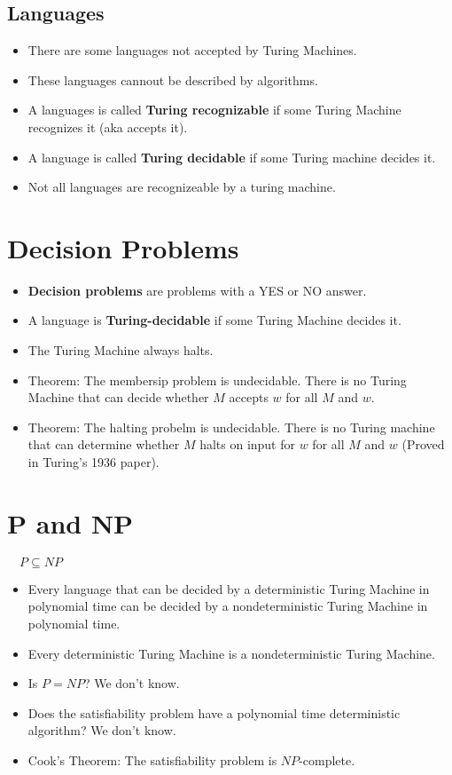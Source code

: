 \documentclass[letter]{article}
\begin{document}
\begin{multicols}{2}
  \subsection{Languages} 
  \begin{itemize} 
    \item There are some languages not accepted by Turing Machines.
    \item These languages cannout be described by algorithms.
    \item A languages is called \textbf{Turing recognizable} if some Turing
          Machine recognizes it (aka accepts it).
    \item A language is called \textbf{Turing decidable} if some Turing machine
          decides it.
    \item Not all languages are recognizeable by a turing machine.
  \end{itemize}

  \section{Decision Problems} 
  \begin{itemize} 
    \item \textbf{Decision problems} are problems with a YES or NO answer.
    \item A language is \textbf{Turing-decidable} if some Turing Machine decides
          it.
    \item The Turing Machine always halts.
    \item Theorem: The membersip problem is undecidable. There is no Turing
          Machine that can decide whether $M$ accepts $w$ for all $M$ and $w$.
    \item Theorem: The halting probelm is undecidable. There is no Turing
          machine that can determine whether $M$ halts on input for $w$ for all
          $M$ and $w$ (Proved in Turing's 1936 paper).
  \end{itemize}

  \section{P and NP} 
  $\quad P \subseteq NP$
  \begin{itemize} 
    \item Every language that can be decided by a deterministic Turing
          Machine in polynomial time can be decided by a nondeterministic
          Turing Machine in polynomial time.
    \item Every deterministic Turing Machine is a nondeterministic Turing
          Machine.
    \item Is $P = NP$? We don't know.
    \item Does the satisfiability problem have a polynomial time deterministic
          algorithm? We don't know.
    \item Cook's Theorem: The satisfiability problem is $NP$-complete.
  \end{itemize}

\end{multicols}
\end{document}
